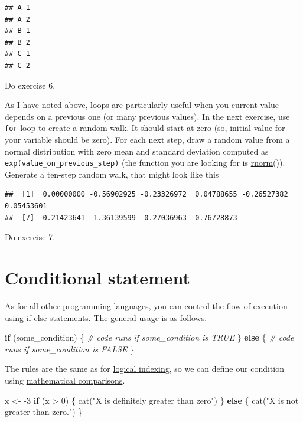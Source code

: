 \documentclass[
]{book}
\newenvironment{Shaded}{\begin{snugshade}}{\end{snugshade}}
\newcommand{\CommentTok}[1]{\textcolor[rgb]{0.56,0.35,0.01}{\textit{#1}}}
\newcommand{\ControlFlowTok}[1]{\textcolor[rgb]{0.13,0.29,0.53}{\textbf{#1}}}
\newcommand{\DecValTok}[1]{\textcolor[rgb]{0.00,0.00,0.81}{#1}}
\newcommand{\FunctionTok}[1]{\textcolor[rgb]{0.00,0.00,0.00}{#1}}
\newcommand{\NormalTok}[1]{#1}
\newcommand{\OtherTok}[1]{\textcolor[rgb]{0.56,0.35,0.01}{#1}}
\newcommand{\SpecialCharTok}[1]{\textcolor[rgb]{0.00,0.00,0.00}{#1}}
\newcommand{\StringTok}[1]{\textcolor[rgb]{0.31,0.60,0.02}{#1}}
\begin{document}
\begin{verbatim}
## A 1 
## A 2 
## B 1 
## B 2 
## C 1 
## C 2
\end{verbatim}

Do exercise 6.

As I have noted above, loops are particularly useful when you current value depends on a previous one (or many previous values). In the next exercise, use \texttt{for} loop to create a random walk. It should start at zero (so, initial value for your variable should be zero). For each next step, draw a random value from a normal distribution with zero mean and standard deviation computed as \texttt{exp(value\_on\_previous\_step)} (the function you are looking for is \href{https://stat.ethz.ch/R-manual/R-devel/library/stats/html/Normal.html}{rnorm()}). Generate a ten-step random walk, that might look like this

\begin{verbatim}
##  [1]  0.00000000 -0.56902925 -0.23326972  0.04788655 -0.26527382  0.05453601
##  [7]  0.21423641 -1.36139599 -0.27036963  0.76728873
\end{verbatim}

Do exercise 7.

\hypertarget{conditional-statement}{%
\section{Conditional statement}\label{conditional-statement}}

As for all other programming languages, you can control the flow of execution using \href{https://stat.ethz.ch/R-manual/R-devel/library/base/html/Control.html}{if-else} statements. The general usage is as follows.

\begin{Shaded}
\begin{Highlighting}[]
\ControlFlowTok{if}\NormalTok{ (some\_condition) \{}
  \CommentTok{\# code runs if some\_condition is TRUE}
\NormalTok{\} }\ControlFlowTok{else}\NormalTok{ \{}
  \CommentTok{\# code runs if some\_condition is FALSE}
\NormalTok{\}}
\end{Highlighting}
\end{Shaded}

The rules are the same as for \protect\hyperlink{logical-indexing}{logical indexing}, so we can define our condition using \href{https://stat.ethz.ch/R-manual/R-devel/library/base/html/Comparison.html}{mathematical comparisons}.

\begin{Shaded}
\begin{Highlighting}[]
\NormalTok{x }\OtherTok{\textless{}{-}} \SpecialCharTok{{-}}\DecValTok{3}
\ControlFlowTok{if}\NormalTok{ (x }\SpecialCharTok{\textgreater{}} \DecValTok{0}\NormalTok{) \{}
  \FunctionTok{cat}\NormalTok{(}\StringTok{"X is definitely greater than  zero"}\NormalTok{)}
\NormalTok{\} }\ControlFlowTok{else}\NormalTok{ \{}
  \FunctionTok{cat}\NormalTok{(}\StringTok{"X is not greater than zero."}\NormalTok{)}
\NormalTok{\}}
\end{Highlighting}
\end{Shaded}
\end{document}

